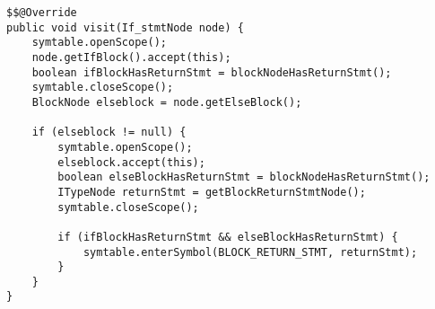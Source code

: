 \begin{lstlisting}[caption={Visit for a if statement node in the Missing return statement visitor.}, label={code:MISRE:ifstmt}]
$$@Override
public void visit(If_stmtNode node) {
    symtable.openScope();
    node.getIfBlock().accept(this);
    boolean ifBlockHasReturnStmt = blockNodeHasReturnStmt();
    symtable.closeScope();
    BlockNode elseblock = node.getElseBlock();
    
    if (elseblock != null) {
        symtable.openScope();
        elseblock.accept(this);
        boolean elseBlockHasReturnStmt = blockNodeHasReturnStmt();
        ITypeNode returnStmt = getBlockReturnStmtNode();
        symtable.closeScope();

        if (ifBlockHasReturnStmt && elseBlockHasReturnStmt) {
            symtable.enterSymbol(BLOCK_RETURN_STMT, returnStmt);
        }
    }
}
\end{lstlisting}